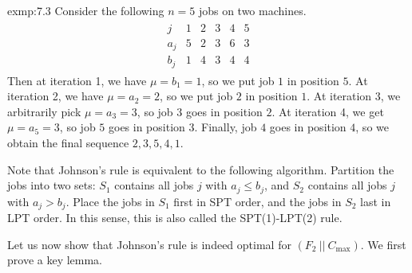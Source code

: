 \begin{exmp}{exmp:7.3}
    Consider the following $n = 5$ jobs on two machines. 
    \begin{align*}
        \begin{array}{c|ccccc}
            j & 1 & 2 & 3 & 4 & 5 \\ \hline 
            a_j & 5 & 2 & 3 & 6 & 3 \\ 
            b_j & 1 & 4 & 3 & 4 & 4
        \end{array}
    \end{align*}
    Then at iteration 1, we have $\mu = b_1 = 1$, so we put job $1$ 
    in position $5$. At iteration 2, we have $\mu = a_2 = 2$, so we put 
    job $2$ in position $1$. At iteration 3, we arbitrarily pick 
    $\mu = a_3 = 3$, so job $3$ goes in position $2$. At iteration 4, 
    we get $\mu = a_5 = 3$, so job $5$ goes in position $3$. Finally, job 
    $4$ goes in position $4$, so we obtain the final sequence 
    $2, 3, 5, 4, 1$. 
\end{exmp}

Note that Johnson's rule is equivalent to the following algorithm. 
Partition the jobs into two sets: $S_1$ contains all jobs $j$ with 
$a_j \leq b_j$, and $S_2$ contains all jobs $j$ with $a_j > b_j$. 
Place the jobs in $S_1$ first in SPT order, and the jobs in $S_2$ last 
in LPT order. In this sense, this is also called the SPT(1)-LPT(2) rule. 

Let us now show that Johnson's rule is indeed optimal for 
$(F_2~||~C_{\max})$. We first prove a key lemma. 

